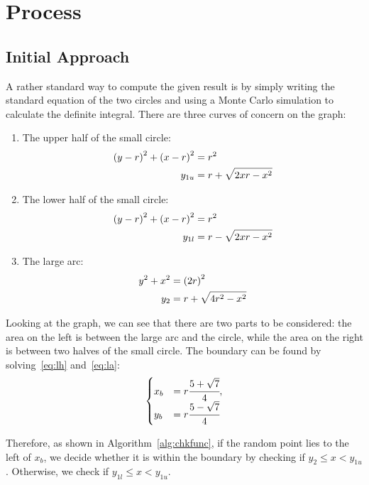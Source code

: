 \documentclass[a4paper]{article}
\begin{document}
\section{Process}
\subsection{Initial Approach}
A rather standard way to compute the given result is by simply writing the standard equation of the two circles and using a Monte Carlo simulation to calculate the definite integral. There are three curves of concern on the graph:
\begin{enumerate}
    \item The upper half of the small circle:
        \begin{align}\label{eq:uh}
            {(y - r)} ^ 2 + {(x - r)} ^ 2 &= r ^ 2 \notag \\
            y_{1u} &= r + \sqrt{2 x r - x^2}
        \end{align}
    \item The lower half of the small circle:
        \begin{align}\label{eq:lh}
            {(y - r)} ^ 2 + {(x - r)} ^ 2 &= r ^ 2 \notag \\
            y_{1l} &= r - \sqrt{2 x r - x^2}
        \end{align}
    \item The large arc:
        \begin{align}\label{eq:la}
            y ^ 2 + x ^ 2 &= {(2r)} ^ 2 \notag \\
            y_2 &= r + \sqrt{4 r ^ 2 - x^2}
        \end{align}
\end{enumerate}

Looking at the graph, we can see that there are two parts to be considered: the area on the left is between the large arc and the circle, while the area on the right is between two halves of the small circle. The boundary can be found by solving~\eqref{eq:lh} and~\eqref{eq:la}:
\begin{align*}
    \begin{cases}
        x_b &= r \cfrac{5 + \sqrt{7}}{4},\\
        y_b &= r \cfrac{5 - \sqrt{7}}{4}
    \end{cases}
\end{align*}

Therefore, as shown in Algorithm~\ref{alg:chkfunc}, if the random point lies to the left of \(x_b\), we decide whether it is within the boundary by checking if \(y_2 \le x < y_{1u}\). Otherwise, we check if \(y_{1l} \le x < y_{1u}\).
\end{document}
